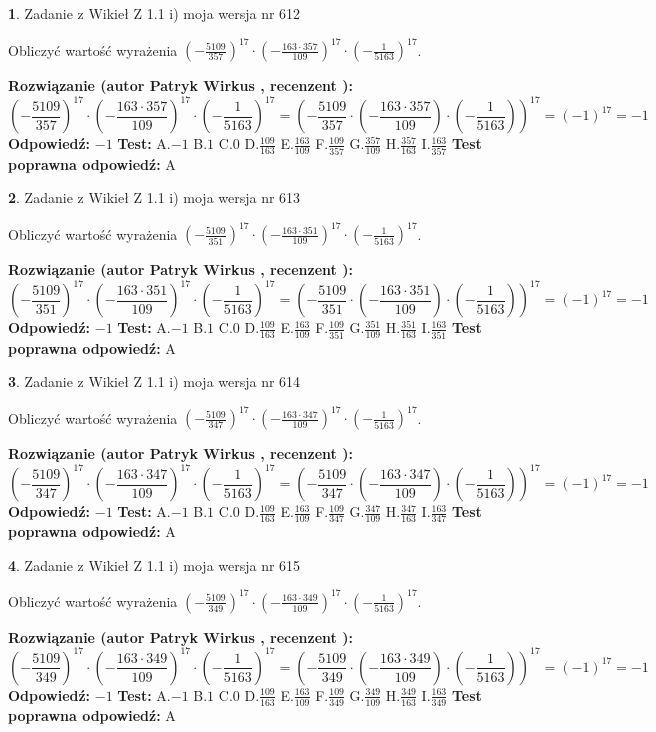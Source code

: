 \documentclass[12pt, a4paper]{article}
\theoremstyle{definition} %
\newtheorem{zad}{}
\newcommand{\zadStart}[1]{\begin{zad}#1\newline}
\newcommand{\zadStop}{\end{zad}}
\newcommand{\rozwStart}[2]{\noindent \textbf{Rozwiązanie (autor #1 , recenzent #2): }\newline}
\newcommand{\rozwStop}{\newline}
\newcommand{\odpStart}{\noindent \textbf{Odpowiedź:}\newline}
\newcommand{\odpStop}{\newline}
\newcommand{\testStart}{\noindent \textbf{Test:}\newline}
\newcommand{\testStop}{\newline}
\newcommand{\kluczStart}{\noindent \textbf{Test poprawna odpowiedź:}\newline}
\newcommand{\kluczStop}{\newline}
\begin{document}
\zadStart{Zadanie z Wikieł Z 1.1 i) moja wersja nr 612}

Obliczyć wartość wyrażenia $(-\frac{5109}{357})^{17} \cdot (-\frac{163 \cdot 357}{109})^{17} \cdot (-\frac{1}{5163})^{17}$.
\zadStop
\rozwStart{Patryk Wirkus}{}
$$(-\frac{5109}{357})^{17} \cdot (-\frac{163 \cdot 357}{109})^{17} \cdot (-\frac{1}{5163})^{17} = (-\frac{5109}{357} \cdot (-\frac{163 \cdot 357}{109}) \cdot (-\frac{1}{5163}))^{17} = (-1)^{17} = -1$$
\rozwStop
\odpStart
$-1$
\odpStop
\testStart
A.$-1$ B.$1$ C.$0$ D.$\frac{109}{163}$ E.$\frac{163}{109}$
F.$\frac{109}{357}$ G.$\frac{357}{109}$
H.$\frac{357}{163}$
I.$\frac{163}{357}$
\testStop
\kluczStart
A
\kluczStop



\zadStart{Zadanie z Wikieł Z 1.1 i) moja wersja nr 613}

Obliczyć wartość wyrażenia $(-\frac{5109}{351})^{17} \cdot (-\frac{163 \cdot 351}{109})^{17} \cdot (-\frac{1}{5163})^{17}$.
\zadStop
\rozwStart{Patryk Wirkus}{}
$$(-\frac{5109}{351})^{17} \cdot (-\frac{163 \cdot 351}{109})^{17} \cdot (-\frac{1}{5163})^{17} = (-\frac{5109}{351} \cdot (-\frac{163 \cdot 351}{109}) \cdot (-\frac{1}{5163}))^{17} = (-1)^{17} = -1$$
\rozwStop
\odpStart
$-1$
\odpStop
\testStart
A.$-1$ B.$1$ C.$0$ D.$\frac{109}{163}$ E.$\frac{163}{109}$
F.$\frac{109}{351}$ G.$\frac{351}{109}$
H.$\frac{351}{163}$
I.$\frac{163}{351}$
\testStop
\kluczStart
A
\kluczStop



\zadStart{Zadanie z Wikieł Z 1.1 i) moja wersja nr 614}

Obliczyć wartość wyrażenia $(-\frac{5109}{347})^{17} \cdot (-\frac{163 \cdot 347}{109})^{17} \cdot (-\frac{1}{5163})^{17}$.
\zadStop
\rozwStart{Patryk Wirkus}{}
$$(-\frac{5109}{347})^{17} \cdot (-\frac{163 \cdot 347}{109})^{17} \cdot (-\frac{1}{5163})^{17} = (-\frac{5109}{347} \cdot (-\frac{163 \cdot 347}{109}) \cdot (-\frac{1}{5163}))^{17} = (-1)^{17} = -1$$
\rozwStop
\odpStart
$-1$
\odpStop
\testStart
A.$-1$ B.$1$ C.$0$ D.$\frac{109}{163}$ E.$\frac{163}{109}$
F.$\frac{109}{347}$ G.$\frac{347}{109}$
H.$\frac{347}{163}$
I.$\frac{163}{347}$
\testStop
\kluczStart
A
\kluczStop



\zadStart{Zadanie z Wikieł Z 1.1 i) moja wersja nr 615}

Obliczyć wartość wyrażenia $(-\frac{5109}{349})^{17} \cdot (-\frac{163 \cdot 349}{109})^{17} \cdot (-\frac{1}{5163})^{17}$.
\zadStop
\rozwStart{Patryk Wirkus}{}
$$(-\frac{5109}{349})^{17} \cdot (-\frac{163 \cdot 349}{109})^{17} \cdot (-\frac{1}{5163})^{17} = (-\frac{5109}{349} \cdot (-\frac{163 \cdot 349}{109}) \cdot (-\frac{1}{5163}))^{17} = (-1)^{17} = -1$$
\rozwStop
\odpStart
$-1$
\odpStop
\testStart
A.$-1$ B.$1$ C.$0$ D.$\frac{109}{163}$ E.$\frac{163}{109}$
F.$\frac{109}{349}$ G.$\frac{349}{109}$
H.$\frac{349}{163}$
I.$\frac{163}{349}$
\testStop
\kluczStart
A
\kluczStop
\end{document}
